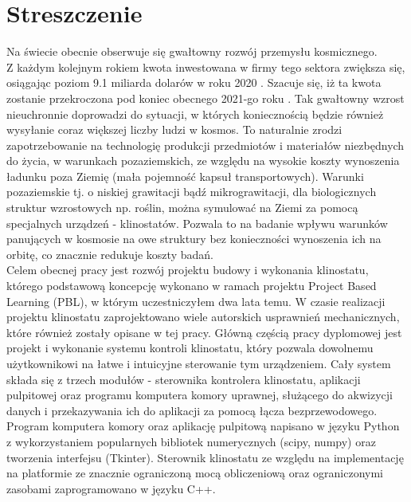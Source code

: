 \chapter*{Streszczenie}

Na świecie obecnie obserwuje się gwałtowny rozwój przemysłu kosmicznego. \\Z każdym kolejnym
 rokiem kwota inwestowana w firmy tego sektora zwiększa się, osiągając poziom 9.1 miliarda
  dolarów w roku 2020 \cite{bib:kosmos_raport_kwartalny_2021}. Szacuje się, iż ta kwota
   zostanie przekroczona pod koniec obecnego 2021-go roku
    \cite{bib:kosmos_raport_kwartalny_2021}. Tak gwałtowny wzrost nieuchronnie doprowadzi do
     sytuacji, w których koniecznością będzie również wysyłanie coraz większej liczby ludzi
      w kosmos. To naturalnie zrodzi zapotrzebowanie na technologię produkcji przedmiotów i
       materiałów niezbędnych do życia, w warunkach pozaziemskich, ze względu na wysokie
        koszty wynoszenia ładunku poza Ziemię (mała pojemność kapsuł transportowych).
         Warunki pozaziemskie tj. o niskiej grawitacji bądź mikrograwitacji, dla
          biologicznych struktur wzrostowych np. roślin, można symulować na Ziemi za pomocą
           specjalnych urządzeń - klinostatów. Pozwala to na badanie wpływu warunków
            panujących w kosmosie na owe struktury bez konieczności wynoszenia ich na
             orbitę, co znacznie redukuje koszty badań.\\

Celem obecnej pracy jest rozwój projektu budowy i wykonania klinostatu, którego podstawową
 koncepcję wykonano w ramach projektu Project Based Learning (PBL), w którym uczestniczyłem
  dwa lata temu. W czasie realizacji projektu klinostatu zaprojektowano wiele autorskich
   usprawnień mechanicznych, które również zostały opisane w tej pracy. Główną częścią pracy
    dyplomowej jest projekt i wykonanie systemu kontroli klinostatu, który pozwala dowolnemu
     użytkownikowi na łatwe i intuicyjne sterowanie tym urządzeniem. Cały system składa się
      z trzech modułów - sterownika kontrolera klinostatu, aplikacji pulpitowej oraz
       programu komputera komory uprawnej, służącego do akwizycji danych i przekazywania ich
        do aplikacji za pomocą łącza bezprzewodowego. Program komputera komory oraz
         aplikację pulpitową napisano w języku Python z wykorzystaniem popularnych bibliotek
          numerycznych (scipy, numpy) oraz tworzenia interfejsu (Tkinter). Sterownik klinostatu ze
           względu na implementację na platformie ze znacznie ograniczoną mocą obliczeniową
            oraz ograniczonymi zasobami zaprogramowano w języku C++. \\

